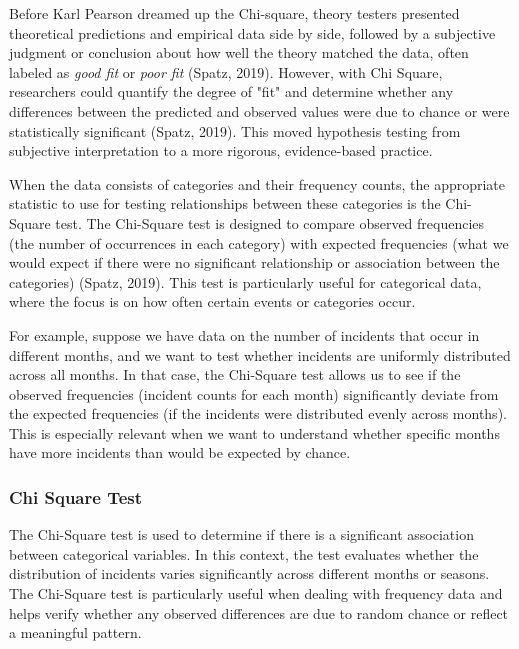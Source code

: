 \documentclass{article}
\begin{document}
Before Karl Pearson dreamed up the Chi-square, theory testers presented theoretical predictions and empirical data side by side, followed by a subjective judgment or conclusion about how well the theory matched the data, often labeled as \textit{good fit} or \textit{poor fit} (Spatz, 2019). However, with Chi Square, researchers could quantify the degree of "fit" and determine whether any differences between the predicted and observed values were due to chance or were statistically significant (Spatz, 2019). This moved hypothesis testing from subjective interpretation to a more rigorous, evidence-based practice.


When the data consists of categories and their frequency counts, the appropriate statistic to use for testing relationships between these categories is the Chi-Square test. The Chi-Square test is designed to compare observed frequencies (the number of occurrences in each category) with expected frequencies (what we would expect if there were no significant relationship or association between the categories) (Spatz, 2019). This test is particularly useful for categorical data, where the focus is on how often certain events or categories occur.

For example, suppose we have data on the number of incidents that occur in different months, and we want to test whether incidents are uniformly distributed across all months. In that case, the Chi-Square test allows us to see if the observed frequencies (incident counts for each month) significantly deviate from the expected frequencies (if the incidents were distributed evenly across months). This is especially relevant when we want to understand whether specific months have more incidents than would be expected by chance.

\subsubsection{Chi Square Test}


The Chi-Square test is used to determine if there is a significant association between categorical variables. In this context, the test evaluates whether the distribution of incidents varies significantly across different months or seasons. The Chi-Square test is particularly useful when dealing with frequency data and helps verify whether any observed differences are due to random chance or reflect a meaningful pattern.
\end{document}
